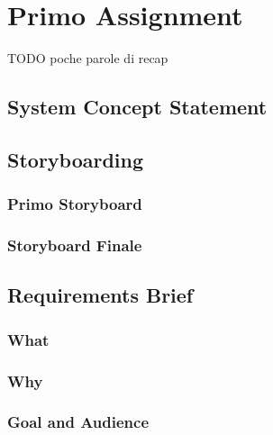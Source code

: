 

\section{Primo Assignment}

TODO poche parole di recap


\subsection{System Concept Statement}

\subsection{Storyboarding}
\subsubsection{Primo Storyboard}
\subsubsection{Storyboard Finale}


\subsection{Requirements Brief}
\subsubsection{What}
\subsubsection{Why}
\subsubsection{Goal and Audience}

